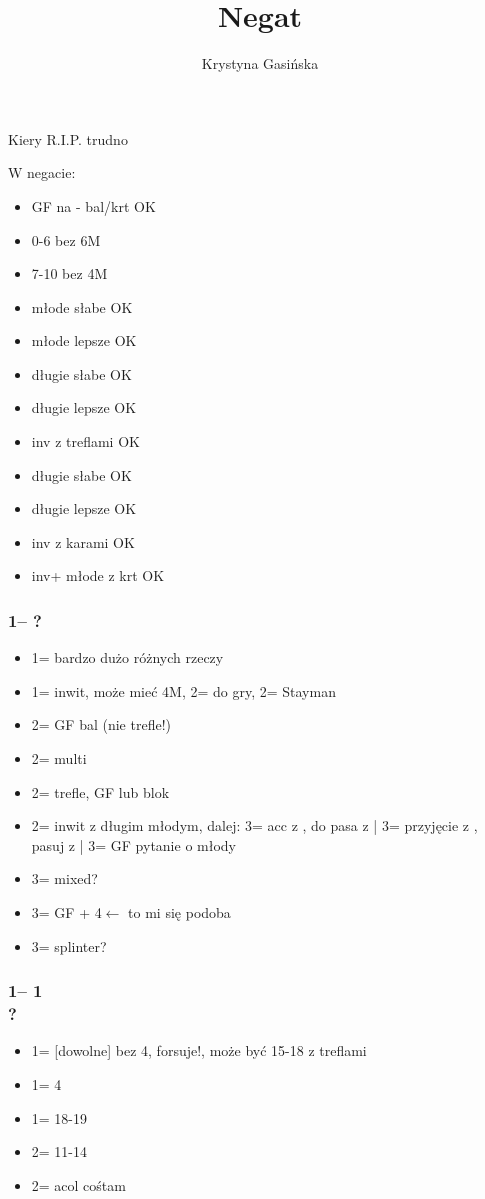 \documentclass[12pt, a4paper]{article}
\title{Negat}
\author{Krystyna Gasińska}
\begin{document}
\maketitle

Kiery \hearts \small{R.I.P.} trudno

W negacie:
\begin{itemize}
    \item GF na \diams - bal/krt OK
    \item 0-6 bez 6M
    \item 7-10 bez 4M
    \item młode słabe OK
    \item młode lepsze OK
    \item długie \clubs słabe OK
    \item długie \clubs lepsze OK
    \item inv z treflami OK
    \item długie \diams słabe OK
    \item długie \diams lepsze OK
    \item inv z karami OK
    \item inv+ młode z krt OK
\end{itemize}

\subsubsection*{1\clubs -- ?}
\begin{itemize}
    \item 1\diams = bardzo dużo różnych rzeczy
    \item 1\nt = inwit, może mieć 4M, 2\clubs = do gry, 2\diams = Stayman 
    \item 2\clubs = GF bal (nie trefle!) 
    \item 2\diams = multi 
    \item 2\spades = trefle, GF lub blok 
    \item 2\nt = inwit z długim młodym, dalej: 3\clubs = acc z \diams, do pasa z \clubs | 3\diams = przyjęcie z \clubs, pasuj z \diams | 3\hearts = GF pytanie o młody 
    \item 3\clubs = mixed? 
    \item 3\diams = GF \diams + 4\major $\leftarrow$ to mi się podoba 
    \item 3\major = splinter?
\end{itemize}

\subsubsection*{1\clubs -- 1\diams \\
                ?}
\begin{itemize}
    \item 1\hearts = [dowolne] bez 4\spades, forsuje!, może być 15-18 z treflami
    \item 1\spades = 4\spades
    \item 1\nt = 18-19 \bal 
    \item 2\clubs = 11-14 \clubs 
    \item 2\diams = acol cośtam
\end{itemize}
\end{document}
